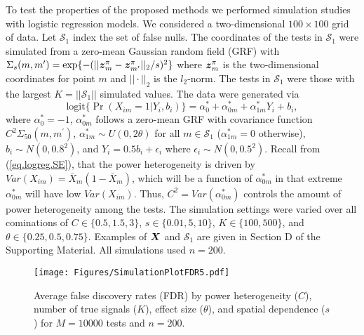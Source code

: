 \documentclass[bimj,fleqn]{w-art}
\newcommand{\mbf}[1]{\mbox{\boldmath${#1}$}}
\theoremstyle{plain}
\theoremstyle{definition}
\begin{document}
To test the properties of the proposed methods we performed simulation studies with logistic regression models. We considered a two-dimensional $100 \times 100$ grid of data.  Let $\mathcal{S}_1$ index the set of false nulls. The coordinates of the tests in $\mathcal{S}_1$ were simulated from a zero-mean Gaussian random field (GRF) with $\Sigma_{s}(m,m^\prime) = \exp\{-(||\mbf{z}^\pi_{m} - \mbf{z}^\pi_{m'}||_2/s)^2\}$ where $\mbf{z}^\pi_{m}$ is the two-dimensional coordinates for point $m$ and $||\cdot||_2$ is the $l_2$-norm.  The tests in $\mathcal{S}_1$ were those with the largest $K = ||\mathcal{S}_1||$ simulated values. The data were generated via
%
\begin{equation}\label{eq.sim.study}
\mbox{logit}\{\Pr(X_{im}=1|Y_i,b_i)\} = \alpha^\ast_0 + \alpha^\ast_{0m} + \alpha^\ast_{1m}Y_i+ b_i,
\end{equation}
%
where $\alpha^\ast_0 = -1$, $\alpha^\ast_{0m}$ follows a zero-mean GRF with covariance function $C^{2} \Sigma_{50}(m,m^\prime)$, $\alpha^\ast_{1m}\sim U(0,2\theta)$ for all $m \in \mathcal{S}_1$ ($\alpha^\ast_{1m}=0$ otherwise), $b_i \sim N(0,0.8^2)$, and $Y_i = 0.5b_i + \epsilon_i$ where $\epsilon_i \sim N(0,0.5^2)$. Recall from (\ref{eq.logreg.SE}), that the power heterogeneity is driven by $Var(X_{im})=\bar X_m(1-\bar X_m)$, which will be a function of $\alpha^\ast_{0m}$ in that extreme $\alpha^\ast_{0m}$ will have low $Var(X_{im})$.  Thus, $C^{2}=Var(\alpha^\ast_{0m})$ controls the amount of power heterogeneity among the tests. The simulation settings were varied over all cominations of $C\in\{0.5, 1.5,3\}$, $s\in \{0.01, 5, 10\}$, $K\in\{100, 500\}$, and $\theta \in \{0.25,0.5,0.75\}$. Examples of $\mbf{X}$ and $\mathcal{S}_1$ are given in Section D of the Supporting Material. All simulations used $n=200$. 



\begin{figure}[t]
\begin{center}
\texttt{[image: Figures/SimulationPlotFDR5.pdf]} 
\end{center}
\vspace{-.2in}
\caption{Average false discovery rates (FDR) by power heterogeneity ($C$), number of true signals ($K$), effect size ($\theta$), and spatial dependence ($s$) for $M=10000$ tests and $n=200$.}\label{fig.bin.sim1}
\end{figure}
\end{document}
